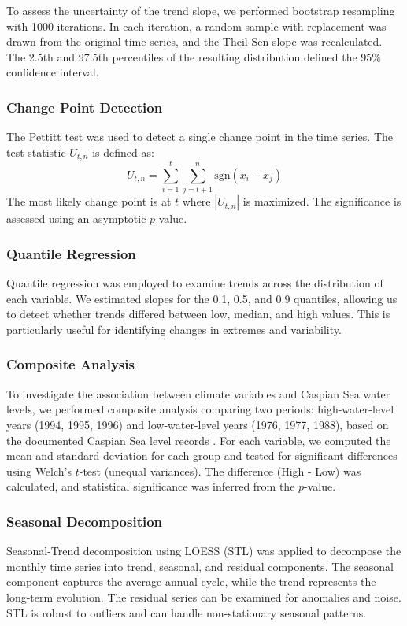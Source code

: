 \documentclass[12pt,a4paper]{article}
\begin{document}
To assess the uncertainty of the trend slope, we performed bootstrap resampling with 1000 iterations. In each iteration, a random sample with replacement was drawn from the original time series, and the Theil-Sen slope was recalculated. The 2.5th and 97.5th percentiles of the resulting distribution defined the 95\% confidence interval.

\subsubsection{Change Point Detection}
The Pettitt test \citep{pettitt1979} was used to detect a single change point in the time series. The test statistic $U_{t,n}$ is defined as:
\begin{equation}
U_{t,n} = \sum_{i=1}^{t} \sum_{j=t+1}^{n} \text{sgn}(x_i - x_j)
\end{equation}
The most likely change point is at $t$ where $|U_{t,n}|$ is maximized. The significance is assessed using an asymptotic $p$-value.

\subsubsection{Quantile Regression}
Quantile regression \citep{koenker2001} was employed to examine trends across the distribution of each variable. We estimated slopes for the 0.1, 0.5, and 0.9 quantiles, allowing us to detect whether trends differed between low, median, and high values. This is particularly useful for identifying changes in extremes and variability.

\subsubsection{Composite Analysis}
To investigate the association between climate variables and Caspian Sea water levels, we performed composite analysis comparing two periods: high-water-level years (1994, 1995, 1996) and low-water-level years (1976, 1977, 1988), based on the documented Caspian Sea level records \citep{arpad2006}. For each variable, we computed the mean and standard deviation for each group and tested for significant differences using Welch's $t$-test (unequal variances). The difference (High - Low) was calculated, and statistical significance was inferred from the $p$-value.

\subsubsection{Seasonal Decomposition}
Seasonal-Trend decomposition using LOESS (STL) \citep{cleveland1990} was applied to decompose the monthly time series into trend, seasonal, and residual components. The seasonal component captures the average annual cycle, while the trend represents the long-term evolution. The residual series can be examined for anomalies and noise. STL is robust to outliers and can handle non-stationary seasonal patterns.
\end{document}
